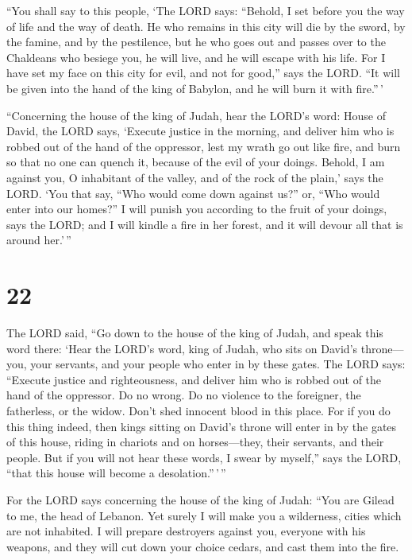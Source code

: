  ``You shall say to this people, `The LORD says: ``Behold,
I set before you the way of life and the way of death.  He
who remains in this city will die by the sword, by the famine, and by
the pestilence, but he who goes out and passes over to the Chaldeans who
besiege you, he will live, and he will escape with his life.
 For I have set my face on this city for evil, and not
for good,'' says the LORD. ``It will be given into the hand of the king
of Babylon, and he will burn it with fire.''\,'

 ``Concerning the house of the king of Judah, hear the
LORD's word:  House of David, the LORD says, `Execute
justice in the morning, and deliver him who is robbed out of the hand of
the oppressor, lest my wrath go out like fire, and burn so that no one
can quench it, because of the evil of your doings. 
Behold, I am against you, O inhabitant of the valley, and of the rock of
the plain,' says the LORD. `You that say, ``Who would come down against
us?'' or, ``Who would enter into our homes?''  I will
punish you according to the fruit of your doings, says the LORD; and I
will kindle a fire in her forest, and it will devour all that is around
her.'\,''

\hypertarget{section-21}{%
\section{22}\label{section-21}}

 The LORD said, ``Go down to the house of the king of
Judah, and speak this word there:  `Hear the LORD's word,
king of Judah, who sits on David's throne---you, your servants, and your
people who enter in by these gates.  The LORD says:
``Execute justice and righteousness, and deliver him who is robbed out
of the hand of the oppressor. Do no wrong. Do no violence to the
foreigner, the fatherless, or the widow. Don't shed innocent blood in
this place.  For if you do this thing indeed, then kings
sitting on David's throne will enter in by the gates of this house,
riding in chariots and on horses---they, their servants, and their
people.  But if you will not hear these words, I swear by
myself,'' says the LORD, ``that this house will become a
desolation.''\,'\,''

 For the LORD says concerning the house of the king of
Judah: ``You are Gilead to me, the head of Lebanon. Yet surely I will
make you a wilderness, cities which are not inhabited.  I
will prepare destroyers against you, everyone with his weapons, and they
will cut down your choice cedars, and cast them into the fire.

